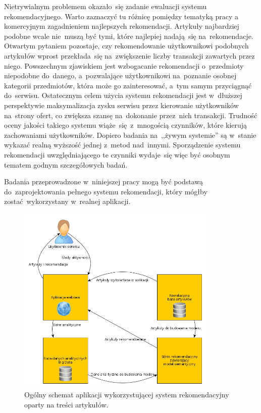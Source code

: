 \documentclass[pl]{minipw} %
\begin{document}
Nietrywialnym problemem okazało~się zadanie ewaluacji systemu rekomendacyjnego. Warto zaznaczyć tu różnicę pomiędzy tematyką pracy a komercyjnym zagadnieniem najlepszych rekomendacji. Artykuły najbardziej podobne wcale nie~muszą być tymi, które najlepiej nadają~się na~rekomendacje. Otwartym pytaniem pozostaje, czy rekomendowanie użytkownikowi podobnych artykułów wprost przekłada~się na~zwiększenie liczby transakcji zawartych przez niego. Powszechnym zjawiskiem jest wzbogacanie rekomendacji o~przedmioty niepodobne do~danego, a~pozwalające użytkownikowi na~poznanie osobnej kategorii przedmiotów, która może go zainteresować, a~tym samym przyciągnąć do~serwisu. Ostatecznym celem użycia systemu rekomendacji jest w~dłuższej perspektywie maksymalizacja zysku serwisu przez kierowanie użytkowników na~strony ofert, co zwiększa szansę na~dokonanie przez~nich transakcji. Trudność oceny jakości takiego systemu wiąże~się z~mnogością czynników, które kierują zachowaniami użytkowników. Dopiero badania na~,,żywym systemie'' są w~stanie wykazać realną wyższość jednej z~metod nad~innymi. Sporządzenie systemu rekomendacji uwzględniającego te czynniki wydaje~się więc być osobnym tematem godnym szczegółowych badań.

Badania przeprowadzone w~niniejszej pracy mogą być podstawą do~zaprojektowania pełnego systemu rekomendacji, który mógłby zostać wykorzystany w~realnej aplikacji.
\begin{figure}[H]
	\centering
	\includegraphics[width=0.85\textwidth]{img/recom_sys_scheme.png}
	\caption{Ogólny schemat aplikacji wykorzystującej system rekomendacyjny oparty na treści artykułów.}
\end{figure}
\end{document}

